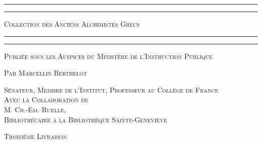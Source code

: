 \documentclass[a4paper, 11pt, oneside, polutonikogreek, french]{article}
\begin{document}
\begin{titlepage} %
	\centering %

	
	\rule{\textwidth}{1.6pt}\vspace*{-\baselineskip}\vspace*{2pt} %
	\rule{\textwidth}{0.4pt} %
	
	\vspace{1\baselineskip} %
	
	{\scshape\Huge Collection des Anciens Alchimistes Grecs}
	
	\vspace{1\baselineskip} %

	\rule{\textwidth}{0.4pt}\vspace*{-\baselineskip}\vspace{3.2pt} %
	\rule{\textwidth}{1.6pt} %
	
	\vspace{1\baselineskip} %
	
	
	{\scshape \normalsize Publiée sous les Auspices du Ministère de l'Instruction Publique}
	
	{\scshape Par \Large Marcellin Berthelot} %
	
	\vspace*{1\baselineskip} %
	
        {\scshape\scriptsize Sénateur, Membre de l'Institut, Professeur au Collège de France \\Avec la Collaboration de \\\large M. Ch.-Em. Ruelle,\\\scriptsize Bibliothécaire a la Bibliothèque Sainte-Geneviève} %
  
        \vspace{4\baselineskip}
  
	{\scshape \normalsize Troisième Livraison} %
  


\end{titlepage}
\end{document}
